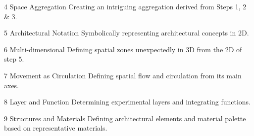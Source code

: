 \begin{minipage}[t][\textheight][t]{\linewidth}
\begin{center}
\begin{minipage}[t]{0.8125\linewidth}
\begin{minipage}[t]{\MinipageBWidth}
				\Figure{%
					
				}%
				{4}%
				{Space Aggregation}%
				{Creating an intriguing aggregation derived from Steps 1, 2 \& 3.}%
			\end{minipage}%
			\vfill
			\setlength{\MinipageAWidth}{\dimexpr0.3\linewidth -\MinipageGap}
			\setlength{\MinipageBWidth}{\dimexpr0.4\linewidth -\MinipageGap}
			\setlength{\MinipageCWidth}{\dimexpr\linewidth -\MinipageAWidth -\MinipageBWidth -\MinipageGap\relax}
			\begin{minipage}[t]{\MinipageAWidth}%
				\Figure{%
					
				}%
				{5}%
				{Architectural Notation}%
				{Symbolically representing architectural concepts in 2D.}%
			\end{minipage}%
			\hspace{\MinipageGap}%
			\begin{minipage}[t]{\MinipageBWidth}%
				\Figure{%
					
				}%
				{6}%
				{Multi-dimensional}%
				{Defining spatial zones unexpectedly in 3D from the 2D of step 5.}%
			\end{minipage}%
			\hspace{\MinipageGap}%
			\begin{minipage}[t]{\MinipageCWidth}%
				\Figure{%
					
				}%
				{7}%
				{Movement as Circulation}%
				{%
					Defining spatial flow and circulation from its main axes.
				}%
			\end{minipage}%
			\vfill
			\setlength{\MinipageAWidth}{\dimexpr0.45\linewidth -\MinipageGap}
			\setlength{\MinipageBWidth}{\dimexpr\linewidth -\MinipageAWidth -\MinipageGap\relax}
			\begin{minipage}[t]{\MinipageAWidth}%
				\Figure{%
					
				}%
				{8}%
				{Layer and Function}%
				{Determining experimental layers and integrating functions.}%
			\end{minipage}%
			\hspace{\MinipageGap}%
			\begin{minipage}[t]{\MinipageBWidth}%
				\Figure{%
					
				}%
				{9}%
				{Structures and Materials}%
				{Defining architectural elements and material palette based on representative materials.}%

\end{minipage}
\end{minipage}
\end{center}
\end{minipage}
